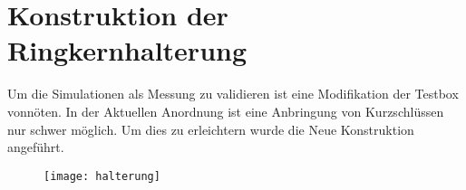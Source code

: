 \section{Konstruktion der Ringkernhalterung}
Um die Simulationen als Messung zu validieren ist eine Modifikation der Testbox vonn\"oten. In der Aktuellen Anordnung ist eine Anbringung von Kurzschl\"ussen nur schwer m\"oglich. Um dies zu erleichtern wurde die Neue Konstruktion angef\"uhrt.
\begin{figure}[h]
	\centering
	\texttt{[image: halterung]}
\end{figure}
